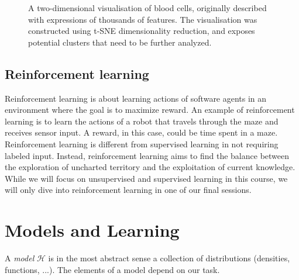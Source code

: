 \begin{refsection}
\begin{figure}[htbp]
\label{fig:tsne-sc}
\caption{A two-dimensional visualisation of blood cells, originally described with expressions of thousands of features. The visualisation was constructed using t-SNE dimensionality reduction, and exposes potential clusters that need to be further analyzed.}
\end{figure}

\subsection*{Reinforcement learning}

Reinforcement learning is about learning actions of software agents in an environment where the goal is to maximize reward. An example of reinforcement learning is to learn the actions of a robot that travels through the maze and receives sensor input. A reward, in this case, could be time spent in a maze. Reinforcement learning is different from supervised learning in not requiring labeled input. Instead, reinforcement learning aims to find the balance between the exploration of uncharted territory and the exploitation of current knowledge. While we will focus on unsupervised and supervised learning in this course, we will only dive into reinforcement learning in one of our final sessions.


\section{Models and Learning}

A {\em model} $\mathcal{H}$ is in the most abstract sense a collection of distributions (densities, functions, ...). The elements of a model depend on our task.


\end{refsection}
